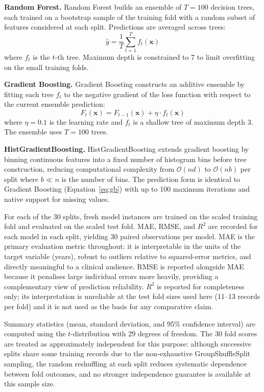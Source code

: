 \documentclass[11pt,a4paper]{report}
\begin{document}
\textbf{Random Forest.} Random Forest builds an ensemble of $T = 100$ decision trees, each trained
on a bootstrap sample of the training fold with a random subset of features considered at each
split. Predictions are averaged across trees:
\begin{equation}
\hat{y} = \frac{1}{T} \sum_{t=1}^{T} f_t(\mathbf{x})
\end{equation}
where $f_t$ is the $t$-th tree. Maximum depth is constrained to 7 to limit overfitting on the
small training folds.

\textbf{Gradient Boosting.} Gradient Boosting constructs an additive ensemble by fitting each tree
$f_t$ to the negative gradient of the loss function with respect to the current ensemble prediction:
\begin{equation}
\label{eq:gb}
F_t(\mathbf{x}) = F_{t-1}(\mathbf{x}) + \eta \cdot f_t(\mathbf{x})
\end{equation}
where $\eta = 0.1$ is the learning rate and $f_t$ is a shallow tree of maximum depth 3. The
ensemble uses $T = 100$ trees.

\textbf{HistGradientBoosting.} HistGradientBoosting extends gradient boosting by binning continuous
features into a fixed number of histogram bins before tree construction, reducing computational
complexity from $\mathcal{O}(nd)$ to $\mathcal{O}(nb)$ per split where $b \ll n$ is the number of
bins. The prediction form is identical to Gradient Boosting (Equation~\ref{eq:gb}) with up to 100
maximum iterations and native support for missing values.

For each of the 30 splits, fresh model instances are trained on the scaled training fold and
evaluated on the scaled test fold. MAE, RMSE, and $R^2$ are recorded for each model in each split, yielding 30 paired observations per model. MAE is the primary evaluation metric throughout: it is interpretable in the units of the target variable (years), robust to outliers relative to squared-error metrics, and directly meaningful to a clinical audience. RMSE is reported alongside MAE because it penalises large individual errors more heavily, providing a complementary view of prediction reliability. $R^2$ is reported for completeness only; its interpretation is unreliable at the test fold sizes used here (11--13 records per fold) and it is not used as the basis for any comparative claim.

Summary statistics (mean, standard deviation, and 95\% confidence interval) are computed using the $t$-distribution with 29 degrees of freedom. The 30 fold scores are treated as approximately independent for this purpose: although successive splits share some training records due to the non-exhaustive GroupShuffleSplit sampling, the random reshuffling at each split reduces systematic dependence between fold outcomes, and no stronger independence guarantee is available at this sample size.
\end{document}
